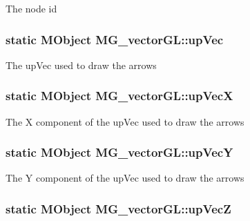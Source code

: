 The node id \hypertarget{class_m_g__vector_g_l_a9fa637bb5b24532d768f5b8912c3f92e}{
\subsubsection[{up\-Vec}]{\setlength{\rightskip}{0pt plus 5cm}static M\-Object M\-G\-\_\-vector\-G\-L\-::up\-Vec\hspace{0.3cm}{\ttfamily [static]}}}\label{class_m_g__vector_g_l_a9fa637bb5b24532d768f5b8912c3f92e}
The up\-Vec used to draw the arrows \hypertarget{class_m_g__vector_g_l_a70c7ff57dc885d2fed64e61fa6dce7c4}{
\subsubsection[{up\-Vec\-X}]{\setlength{\rightskip}{0pt plus 5cm}static M\-Object M\-G\-\_\-vector\-G\-L\-::up\-Vec\-X\hspace{0.3cm}{\ttfamily [static]}}}\label{class_m_g__vector_g_l_a70c7ff57dc885d2fed64e61fa6dce7c4}
The X component of the up\-Vec used to draw the arrows \hypertarget{class_m_g__vector_g_l_abccaa6f4f93a98f68c0aec200763f6c5}{
\subsubsection[{up\-Vec\-Y}]{\setlength{\rightskip}{0pt plus 5cm}static M\-Object M\-G\-\_\-vector\-G\-L\-::up\-Vec\-Y\hspace{0.3cm}{\ttfamily [static]}}}\label{class_m_g__vector_g_l_abccaa6f4f93a98f68c0aec200763f6c5}
The Y component of the up\-Vec used to draw the arrows \hypertarget{class_m_g__vector_g_l_aa5348daa3385f54237190545cdf21009}{
\subsubsection[{up\-Vec\-Z}]{\setlength{\rightskip}{0pt plus 5cm}static M\-Object M\-G\-\_\-vector\-G\-L\-::up\-Vec\-Z\hspace{0.3cm}{\ttfamily [static]}}}\label{class_m_g__vector_g_l_aa5348daa3385f54237190545cdf21009}
